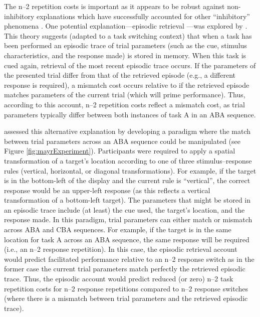\documentclass[a4paper, doc, natbib]{apa6}
\begin{document}
The n--2 repetition costs is important as it appears to be robust against non-inhibitory explanations which have successfully accounted for other ``inhibitory'' phenomena \citep{Mayr2007}. One potential explanation---episodic retrieval \citep{Neill1997}---was explored by \cite{Mayr2002}. This theory suggests (adapted to a task switching context) that when a task has been performed an episodic trace of trial parameters (such as the cue, stimulus characteristics, and the response made) is stored in memory. When this task is cued again, retrieval of the most recent episodic trace occurs. If the parameters of the presented trial differ from that of the retrieved episode (e.g., a different response is required), a mismatch cost occurs relative to if the retrieved episode matches parameters of the current trial (which will prime performance). Thus, according to this account, n--2 repetition costs reflect a mismatch cost, as trial parameters typically differ between both instances of task A in an ABA sequence.

\cite{Mayr2002} assessed this alternative explanation by developing a paradigm where the match between trial parameters across an ABA sequence could be manipulated (see Figure \ref{fig:mayrExperiment}). Participants were required to apply a spatial transformation of a target's location according to one of three stimulus--response rules (vertical, horizontal, or diagonal transformations). For example, if the target is in the bottom-left of the display and the current rule is ``vertical'', the correct response would be an upper-left response (as this reflects a vertical transformation of a bottom-left target). The parameters that might be stored in an episodic trace include (at least) the cue used, the target's location, and the response made. In this paradigm, trial parameters can either match or mismatch across ABA and CBA sequences. For example, if the target is in the same location for task A across an ABA sequence, the same response will be required (i.e., an n--2 response repetition). In this case, the episodic retrieval account would predict facilitated performance relative to an n--2 response switch as in the former case the current trial parameters match perfectly the retrieved episodic trace. Thus, the episodic account would predict reduced (or zero) n--2 task repetition costs for n--2 response repetitions compared to n--2 response switches (where there is a mismatch between trial parameters and the retrieved episodic trace).
\end{document}
